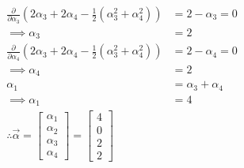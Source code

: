 \documentclass{article}
\begin{document}
\begin{align*}
\frac{\partial}{\partial \alpha_3} \left( 2 \alpha_3 + 2 \alpha_4 - \frac{1}{2} \left( \alpha_3^2  + \alpha_4^2     \right) \right) &= 2-\alpha_3 = 0 \\ \implies \alpha_3 &= 2 \\
\frac{\partial}{\partial \alpha_4} \left( 2 \alpha_3 + 2 \alpha_4 - \frac{1}{2} \left( \alpha_3^2  + \alpha_4^2     \right) \right) &= 2-\alpha_4 = 0 \\ \implies \alpha_4 &= 2 \\
\alpha_1 &= \alpha_3 + \alpha_4 \\
\implies \alpha_1 &= 4 \\
\boxed{\therefore \vec{\alpha} = \begin{bmatrix} \alpha_1 \\ \alpha_2 \\ \alpha_3 \\ \alpha_4 \end{bmatrix} = \begin{bmatrix} 4 \\ 0 \\ 2 \\ 2 \end{bmatrix}		}
\end{align*}
\end{document}
